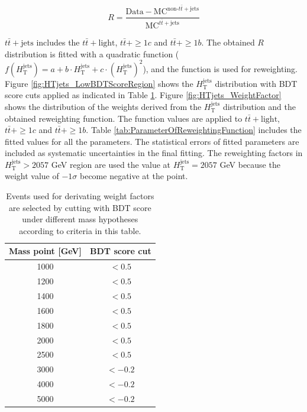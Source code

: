 \begin{equation}
  R = \frac{\text{Data}-\text{MC}^{\text{non-}t\bar{t}+\text{jets}}}{\text{MC}^{t\bar{t}+\text{jets}}}
\end{equation}

$t\bar{t}+\text{jets}$ includes the $t\bar{t}+\text{light}$, $t\bar{t}+\geq1c$ and $t\bar{t}+\geq1b$. The obtained $R$ distribution is fitted with a quadratic function ($f(H_{\text{T}}^{\text{jets}}) = a + b \cdot H_{\text{T}}^{\text{jets}} + c \cdot (H_{\text{T}}^{\text{jets}})^{2}$), and the function is used for reweighting. Figure \ref{fig:HTjets_LowBDTScoreRegion} shows the $H_{\text{T}}^{\text{jets}}$ distribution with BDT score cuts applied as indicated in Table \ref{tab:ReqForRWControlRegion}. Figure \ref{fig:HTjets_WeightFactor} shows the distribution of the weights derived from the $H_{\text{T}}^{\text{jets}}$ distribution and the obtained reweighting function. The function values are applied to $t\bar{t}+\text{light}$, $t\bar{t}+\geq1c$ and $t\bar{t}+\geq1b$. Table \ref{tab:ParameterOfReweightingFunction} includes the fitted values for all the parameters. The statistical errors of fitted parameters are included as systematic uncertainties in the final fitting. The reweighting factors in $H_{\text{T}}^{\text{jets}}>2057$ GeV region are used the value at $H_{\text{T}}^{\text{jets}}=2057$ GeV because the weight value of $-1\sigma$ become negative at the point.

\begin{table}[H]
  \centering
  \begin{tabular*}{70mm}{@{\extracolsep{\fill}}cc}
    \hline\hline
    Mass point [GeV] & BDT score cut\\
    \hline
    1000             & $< 0.5$\\
    1200             & $< 0.5$\\
    1400             & $< 0.5$\\
    1600             & $< 0.5$\\
    1800             & $< 0.5$\\
    2000             & $< 0.5$\\
    2500             & $< 0.5$\\
    3000             & $<-0.2$\\
    4000             & $<-0.2$\\
    5000             & $<-0.2$\\
    \hline\hline
  \end{tabular*}
  \caption{Events used for derivating weight factors are selected by cutting with BDT score under different mass hypotheses according to criteria in this table.}
  \label{tab:ReqForRWControlRegion}
\end{table}


